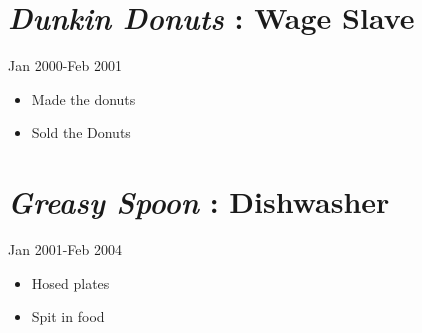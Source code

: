 \section*{\textit{Dunkin Donuts}
 : \textbf{Wage Slave}
}
  \label{_dunkindonuts
_wageslave
}
  \textsf{Jan 2000-Feb 2001}
      

\begin{itemize}
    \item Made the donuts
    \item Sold the Donuts
\end{itemize}
       
\section*{\textit{Greasy Spoon}
 : \textbf{Dishwasher}
}
  \label{_greasyspoon
_dishwasher
}
  \textsf{Jan 2001-Feb 2004}
      

\begin{itemize}
    \item Hosed plates
    \item Spit in food
\end{itemize}
       
